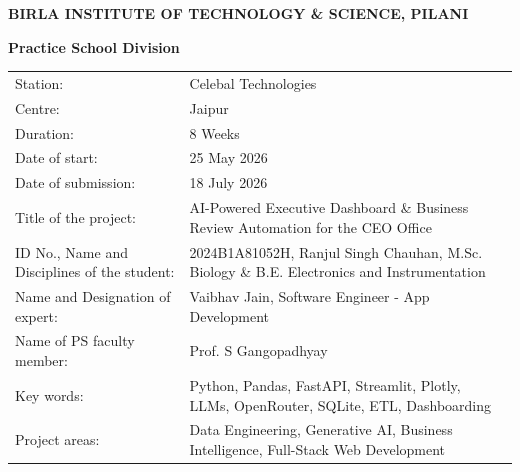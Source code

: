 \documentclass{book}
\begin{document}
	\centerline{\bf BIRLA INSTITUTE OF TECHNOLOGY \& SCIENCE, PILANI}
	\vspace*{0.2cm}

    \centerline{\bf Practice School Division}
\vspace*{0.3cm}

\begin{center}
    \begin{tabular}{@{}p{5.5cm} p{9.5cm}@{}}

    Station: & Celebal Technologies \\[0.2cm]

    Centre: & Jaipur \\[0.2cm]

    Duration: & 8 Weeks \\[0.2cm]

    Date of start: & 25 May 2026 \\[0.2cm]

    Date of submission: & 18 July 2026 \\[0.2cm]

    Title of the project: & AI-Powered Executive Dashboard \& Business Review Automation for the CEO Office \\[0.2cm]

    ID No., Name and Disciplines of the student: & 2024B1A81052H, Ranjul Singh Chauhan, M.Sc. Biology \& B.E. Electronics and Instrumentation \\[0.2cm]

    Name and Designation of expert: & Vaibhav Jain, Software Engineer - App Development \\[0.2cm]

    Name of PS faculty member: & Prof. S Gangopadhyay \\[0.2cm]

    Key words: & Python, Pandas, FastAPI, Streamlit, Plotly, LLMs, OpenRouter, SQLite, ETL, Dashboarding \\[0.2cm]

    Project areas: & Data Engineering, Generative AI, Business Intelligence, Full-Stack Web Development \\[0.2cm]


\end{tabular}
\end{center}
\end{document}
